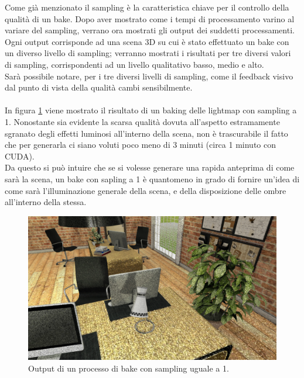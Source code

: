 Come già menzionato il sampling è la caratteristica chiave per il controllo della qualità di un bake. Dopo aver mostrato come i tempi di processamento varino al variare del sampling, verrano ora mostrati gli output dei suddetti processamenti.
\\
Ogni output corrisponde ad una scena 3D su cui è stato effettuato un bake con un diverso livello di sampling; verranno mostrati i risultati per tre diversi valori di sampling, corrispondenti ad un livello qualitativo basso, medio e alto.
\\
Sarà possibile notare, per i tre diversi livelli di sampling, come il feedback visivo dal punto di vista della qualità cambi sensibilmente.
\\
\\
In figura \ref{fig:sampl1} viene mostrato il risultato di un baking delle lightmap con sampling a 1. Nonostante sia evidente la scarsa qualità dovuta all’aspetto estramamente sgranato degli effetti luminosi all’interno della scena, non è trascurabile il fatto che per generarla ci siano voluti poco meno di 3 minuti (circa 1 minuto con CUDA). 
\\
Da questo si può intuire che se si volesse generare una rapida anteprima di come sarà la scena, un bake con sapling a 1 è quantomeno in grado di fornire un’idea di come sarà l’illuminazione generale della scena, e della disposizione delle ombre all’interno della stessa.
\\
\begin{figure}[htb]
 \centering
 \includegraphics[width=0.8\linewidth]{images/chapter_prove_sperimentali/sampl1.png}\hfill
 \caption[Output sampling 1]{Output di un processo di bake con sampling uguale a 1.}
 \label{fig:sampl1}
\end{figure}

